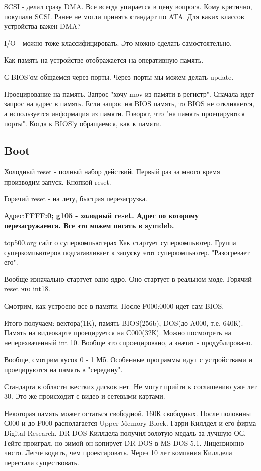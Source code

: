 SCSI - делал сразу DMA. Все всегда упирается в цену вопроса. Кому критично, покупали SCSI. Ранее не могли принять стандарт по ATA. Для каких классов устройства важен DMA?

I/O - можно тоже классифицировать. Это можно сделать самостоятельно. 

Как память на устройстве отображается на оперативную память. 

С BIOS'ом общаемся через порты. Через порты мы можем делать update.

Проецирование на память. Запрос "хочу mov из памяти в регистр". Сначала идет запрос на адрес в память. Если запрос на BIOS память, то BIOS не откликается, а используется информация из памяти.
Говорят, что "на память проецируются порты". Когда к BIOS'у обращаемся, как к памяти.   

\subsection{Boot}
Холодный reset - полный набор действий. Первый раз за много время производим запуск. Кнопкой reset.

Горячий reset - на лету, быстрая перезагрузка.

Адрес:\bfseries FFFF:0; \mdseries g105 - холодный reset. Адрес по которому перезагружаемся. Все это можем писать в symdeb.

top500.org сайт о суперкомпьютерах
Как стартует суперкомпьютер. Группа суперкомпьютеров подгатавливает к запуску этот суперкомпьютер. "Разогревает его".

Вообще изначально стартует одно ядро. Оно стартует в реальном моде.
Горячий reset это int18. 

Смотрим, как устроено все в памяти. После F000:0000 идет сам BIOS.

Итого получаем: вектора(1K), память BIOS(256b), DOS(до A000, т.е. 640К). Память на видеокарте проецируется на С000(32К). Можно посмотреть на неперехваченный int 10. Вообще это спроецировано, а значит - продублировано. 

Вообще, смотрим кусок 0 - 1 Мб. Особенные программы идут с устройствами и проецируются на память в "середину".

Стандарта в области жестких дисков нет. Не могут прийти к соглашению уже лет 30. Это же происходит с видео и сетевыми картами. 

Некоторая память может остаться свободной. 160К свободных. После половины С000 и до F000 располагается Upper Memory Block. Гарри Киллдел и его фирма Digital Research. DR-DOS Киллдела получил золотую медаль за лучшую ОС. Гейтс проиграл, но зимой он копирует DR-DOS в MS-DOS 5.1. Лицензионно чисто. Легче кодить, чем проектировать. Через 10 лет компания Киллдела перестала существовать. 

